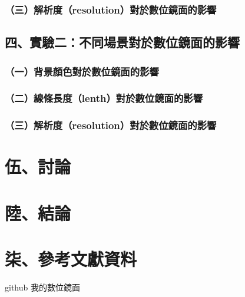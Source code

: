 \documentclass[12pt]{article}
\begin{document}
\subsubsection{（三）解析度（resolution）對於數位鏡面的影響}

\subsection{四、實驗二：不同場景對於數位鏡面的影響}

\subsubsection{（一）背景顏色對於數位鏡面的影響}

\subsubsection{（二）線條長度（lenth）對於數位鏡面的影響}

\subsubsection{（三）解析度（resolution）對於數位鏡面的影響}

\newpage
\section{伍、討論}

\newpage
\section{陸、結論}

\newpage
\section{柒、參考文獻資料}

github 我的數位鏡面
\end{document}
